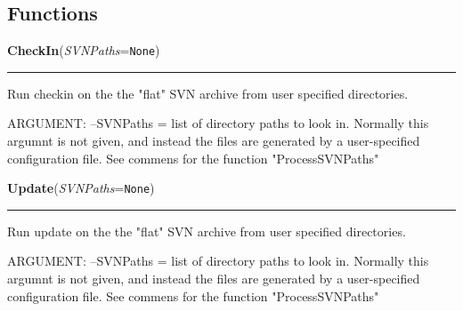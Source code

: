   \subsection{Functions}

    \label{System:SVNOperations:CheckIn}

    \vspace{0.5ex}

\hspace{.8\funcindent}\begin{boxedminipage}{\funcwidth}

    \raggedright \textbf{CheckIn}(\textit{SVNPaths}={\tt None})

    \vspace{-1.5ex}

    \rule{\textwidth}{0.5\fboxrule}
\setlength{\parskip}{2ex}
    Run checkin on the the "flat" SVN archive from user specified 
    directories.

    ARGUMENT: --SVNPaths = list of directory paths to look in.  Normally 
    this argumnt is not given, and instead the files are generated by a 
    user-specified configuration file. See commens for the function 
    "ProcessSVNPaths"

\setlength{\parskip}{1ex}
    \end{boxedminipage}

    \label{System:SVNOperations:Update}

    \vspace{0.5ex}

\hspace{.8\funcindent}\begin{boxedminipage}{\funcwidth}

    \raggedright \textbf{Update}(\textit{SVNPaths}={\tt None})

    \vspace{-1.5ex}

    \rule{\textwidth}{0.5\fboxrule}
\setlength{\parskip}{2ex}
    Run update on the the "flat" SVN archive from user specified 
    directories.

    ARGUMENT: --SVNPaths = list of directory paths to look in.  Normally 
    this argumnt is not given, and instead the files are generated by a 
    user-specified configuration file. See commens for the function 
    "ProcessSVNPaths"

\setlength{\parskip}{1ex}
    \end{boxedminipage}

